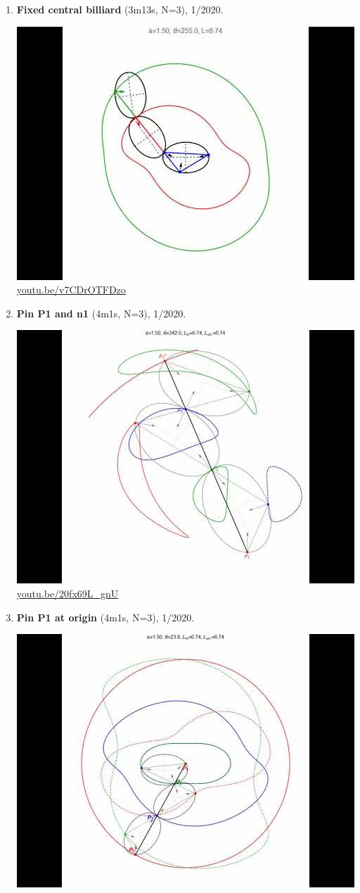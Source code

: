 \documentclass[12pt]{amsart}
\begin{document}
\begin{enumerate}[resume]
\item \textbf{Fixed central billiard} (3m13s, N=3), 1/2020. 
\begin{center}\includegraphics[width=.5\textwidth]{pics/v7CDrOTFDzo.jpg} \\ 
\href{https://youtu.be/v7CDrOTFDzo}{\url{youtu.be/v7CDrOTFDzo}}\end{center}
% 
\item \textbf{Pin P1 and n1} (4m1s, N=3), 1/2020. 
\begin{center}\includegraphics[width=.5\textwidth]{pics/20fx69L_gnU.jpg} \\ 
\href{https://youtu.be/20fx69L_gnU}{\url{youtu.be/20fx69L\_gnU}}\end{center}
% 
\item \textbf{Pin P1 at origin} (4m1s, N=3), 1/2020. 
\begin{center}\includegraphics[width=.5\textwidth]{pics/cPDPb7RmXR4.jpg} \\ 

\end{center}
\end{enumerate}
\end{document}
